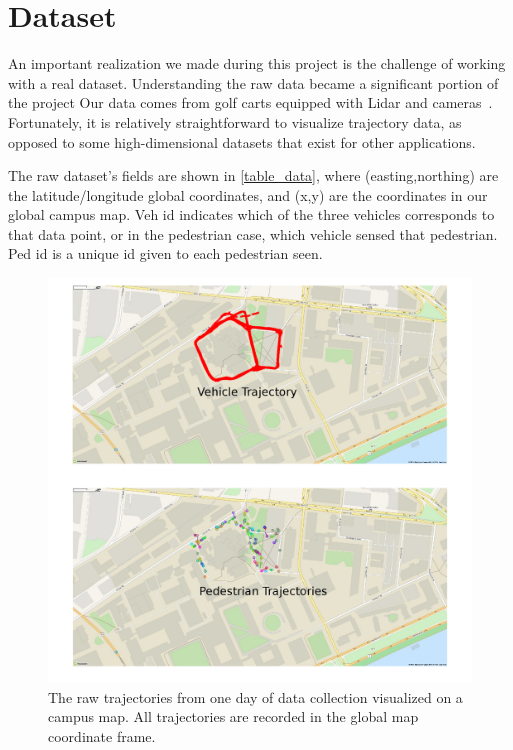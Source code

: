 
\section{Dataset} \label{sec:dataset}

An important realization we made during this project is the challenge of working with a real dataset.
Understanding the raw data became a significant portion of the project
Our data comes from golf carts equipped with Lidar and cameras~\cite{Miller16_IROS,Miller17_predictive_ICRA}.
Fortunately, it is relatively straightforward to visualize trajectory data, as opposed to some high-dimensional datasets that exist for other applications. 

The raw dataset's fields are shown in \cref{table_data}, where (easting,northing) are the latitude/longitude global coordinates, and (x,y) are the coordinates in our global campus map.
Veh id indicates which of the three vehicles corresponds to that data point, or in the pedestrian case, which vehicle sensed that pedestrian.
Ped id is a unique id given to each pedestrian seen.

\begin{figure}
	\centering
	\includegraphics [trim=0 0 0 0, clip, angle=0, width=0.8\columnwidth,
	keepaspectratio]{figures/traj_on_map}
	\caption{The raw trajectories from one day of data collection visualized on a campus map. All trajectories are recorded in the global map coordinate frame.} 
	\label{fig:traj_on_map} 
\end{figure}

